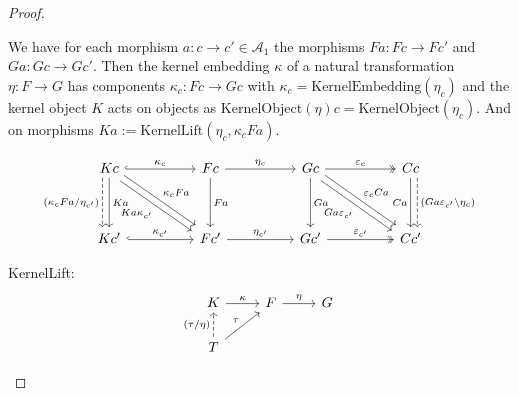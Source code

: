\begin{proof}
\begin{enumerate}
\begin{subproof}
We have for each morphism $a : c \rightarrow c' \in \mathcal{A}_{1}$ the morphisms $Fa : Fc \rightarrow Fc'$ and
$Ga : Gc \rightarrow Gc'$. Then the kernel embedding $\kappa$ of a natural transformation $\eta : F \rightarrow G$ has components
$\kappa_{c} : Fc \rightarrow Gc$ with $\kappa_{c} = \mathrm{KernelEmbedding}(\eta_{c})$ and the kernel object $K$ acts on objects
as $\mathrm{KernelObject}(\eta)c = \mathrm{KernelObject}(\eta_{c})$.
And on morphisms $Ka := \mathrm{KernelLift}(\eta_{c},\kappa_{c}Fa)$.

\[
\begin{tikzcd}
Kc \arrow[dd, "Ka"] \arrow[rr, "\kappa_{c}", hook] \arrow[rrdd, "\kappa_{c}Fa", shift left] \arrow[rrdd, "Ka\kappa_{c'}"', shift right] \arrow[dd, "(\kappa_{c}Fa/\eta_{c'})"', dashed, shift right=2] &  & Fc \arrow[rr, "\eta_{c}"] \arrow[dd, "Fa"] &  & Gc \arrow[dd, "Ga"] \arrow[rr, "\varepsilon_{c}", two heads] \arrow[rrdd, "Ga\varepsilon_{c'}"', shift right] \arrow[rrdd, "\varepsilon_{c}Ca", shift left] &  & Cc \arrow[dd, "Ca"'] \arrow[dd, "(Ga\varepsilon_{c'}\backslash \eta_{c})", dashed, shift left=2] \\
                                                                                                                                                                                                       &  &                                            &  &                                                                                                                                                             &  &                                                                                                  \\
Kc' \arrow[rr, "\kappa_{c'}", hook]                                                                                                                                                                    &  & Fc' \arrow[rr, "\eta_{c'}"]                &  & Gc' \arrow[rr, "\varepsilon_{c'}", two heads]                                                                                                               &  & Cc'                                                                                             
\end{tikzcd}
\]

KernelLift:
\[
\begin{tikzcd}
K \arrow[r, "\kappa"]                                   & F \arrow[r, "\eta"] & G \\
T \arrow[ru, "\tau"] \arrow[u, "(\tau / \eta)", dashed] &                     &  
\end{tikzcd}
\]


\end{subproof}
\end{enumerate}
\end{proof}
